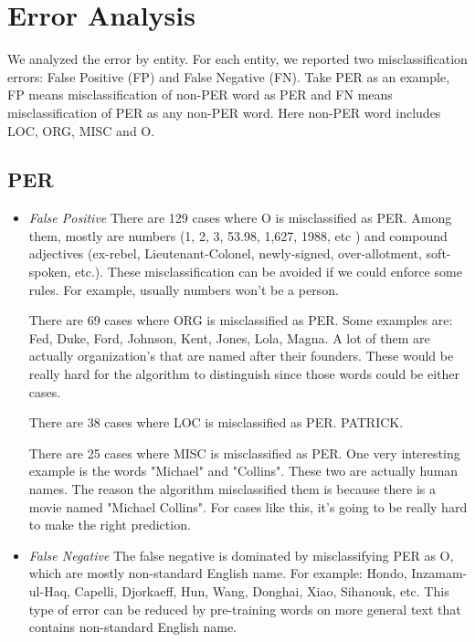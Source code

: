 \documentclass[11pt, oneside]{article}   	%
\begin{document}
\section{Error Analysis}

We analyzed the error by entity. For each entity, we reported two misclassification errors: False Positive (FP) and False Negative (FN). Take PER as an example,  FP means misclassification of non-PER word as PER and FN means misclassification of PER as any non-PER word. Here non-PER word includes LOC, ORG, MISC and O. 


\subsection{PER}
\begin{itemize}
\item \emph{False Positive}
There are 129 cases where O is misclassified as PER. Among them, mostly are numbers (1, 2, 3, 53.98, 1,627, 1988, etc ) and compound adjectives (ex-rebel, Lieutenant-Colonel, newly-signed, over-allotment, soft-spoken, etc.). These misclassification can be avoided if we could enforce some rules. For example, usually numbers won't be a person.

There are 69 cases where ORG is misclassified as PER. Some examples are: Fed, Duke, Ford, Johnson, Kent, Jones, Lola, Magna. A lot of them are actually organization's that are named after their founders. These would be really hard for the algorithm to distinguish since those words could be either cases. 


There are 38 cases where LOC is misclassified as PER. PATRICK. 

There are 25 cases where MISC is misclassified as PER. One very interesting example is the words "Michael" and "Collins". These two are actually human names. The reason the algorithm misclassified them is because there is a movie named "Michael Collins". For cases like this, it's going to be really hard to make the right prediction. 


\item \emph{False Negative}
The false negative is dominated by misclassifying PER as O, which are mostly non-standard English name. For example: Hondo, Inzamam-ul-Haq, Capelli, Djorkaeff, Hun, Wang, Donghai, Xiao, Sihanouk, etc. This type of error can be reduced by pre-training words on more general text that contains non-standard English name.

\end{itemize}
\end{document}
